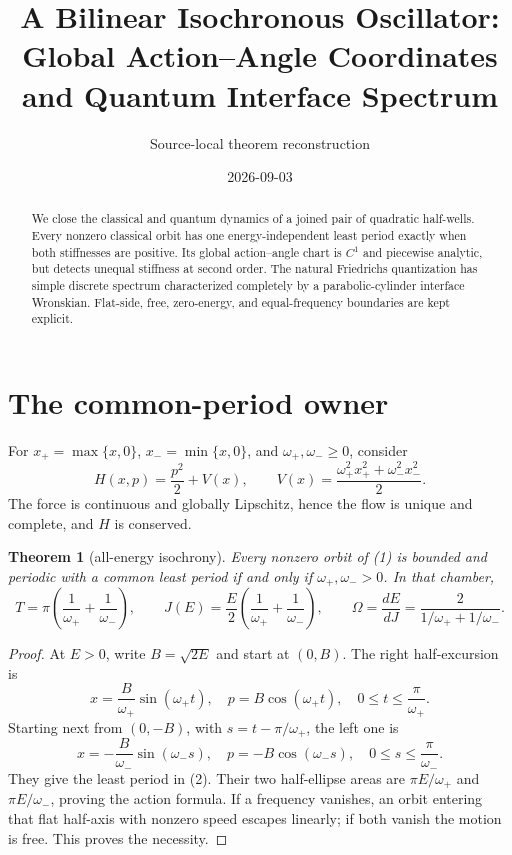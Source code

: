 \documentclass[10pt]{article}
\title{\vspace{-1.2em}A Bilinear Isochronous Oscillator: Global Action--Angle Coordinates and Quantum Interface Spectrum}
\author{Source-local theorem reconstruction}
\date{2026-09-03}
\newtheorem{theorem}{Theorem}
\begin{document}
\maketitle
\begin{abstract}
We close the classical and quantum dynamics of a joined pair of quadratic
half-wells. Every nonzero classical orbit has one energy-independent least
period exactly when both stiffnesses are positive. Its global action--angle
chart is \(C^1\) and piecewise analytic, but detects unequal stiffness at
second order. The natural Friedrichs quantization has simple discrete
spectrum characterized completely by a parabolic-cylinder interface
Wronskian. Flat-side, free, zero-energy, and equal-frequency boundaries are
kept explicit.
\end{abstract}

\section{The common-period owner}
For \(x_+=\max\{x,0\}\), \(x_-=\min\{x,0\}\), and
\(\omega_+,\omega_-\geq0\), consider
\[
 H(x,p)=\frac{p^2}{2}+V(x),\qquad
 V(x)=\frac{\omega_+^2x_+^2+\omega_-^2x_-^2}{2}.               \tag{1}
\]
The force is continuous and globally Lipschitz, hence the flow is unique and
complete, and \(H\) is conserved.

\begin{theorem}[all-energy isochrony]\label{thm:classical}
Every nonzero orbit of (1) is bounded and periodic with a common least period
if and only if \(\omega_+,\omega_->0\). In that chamber,
\[
 T=\pi\left(\frac1{\omega_+}+\frac1{\omega_-}\right),\qquad
 J(E)=\frac E2\left(\frac1{\omega_+}+\frac1{\omega_-}\right),
 \qquad
 \Omega=\frac{dE}{dJ}=\frac2{1/\omega_++1/\omega_-}.           \tag{2}
\]
\end{theorem}
\begin{proof}
At \(E>0\), write \(B=\sqrt{2E}\) and start at \((0,B)\). The right
half-excursion is
\[
 x=\frac B{\omega_+}\sin(\omega_+t),\quad
 p=B\cos(\omega_+t),\quad 0\leq t\leq\frac\pi{\omega_+}.
\]
Starting next from \((0,-B)\), with \(s=t-\pi/\omega_+\), the left one is
\[
 x=-\frac B{\omega_-}\sin(\omega_-s),\quad
 p=-B\cos(\omega_-s),\quad 0\leq s\leq\frac\pi{\omega_-}.
\]
They give the least period in (2). Their two half-ellipse areas are
\(\pi E/\omega_+\) and \(\pi E/\omega_-\), proving the action formula.
If a frequency vanishes, an orbit entering that flat half-axis with nonzero
speed escapes linearly; if both vanish the motion is free. This proves the
necessity.
\end{proof}
\end{document}
